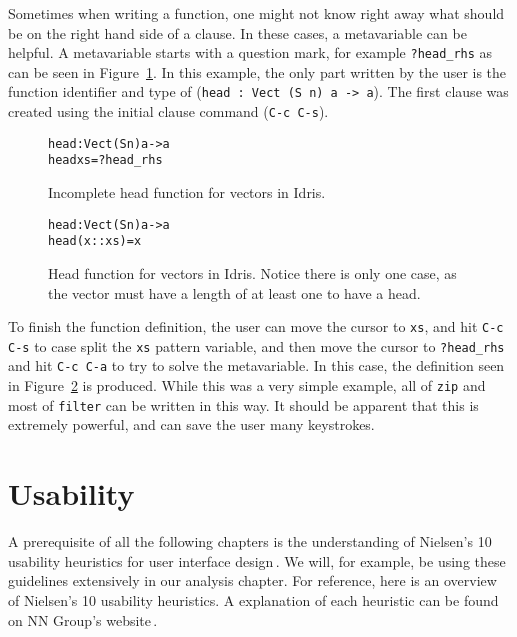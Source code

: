 Sometimes when writing a function, one might not know right away what should be on the right hand side of a clause.
In these cases, a metavariable can be helpful. A metavariable starts with a question mark, for example \texttt{?head\_rhs} as can be seen in Figure~\ref{fig:incomplete_head}.
In this example, the only part written by the user is the function identifier and type of (\texttt{head : Vect (S n) a -> a}).
The first clause was created using the initial clause command (\texttt{C-c C-s}).

\begin{figure}[ht]
\begin{alltt}
head : Vect (S n) a -> a
head xs = ?head_rhs
\end{alltt}
\caption{Incomplete head function for vectors in Idris.}
\label{fig:incomplete_head}
\end{figure}

\begin{figure}[ht]
\begin{alltt}
head : Vect (S n) a -> a
head (x :: xs) = x
\end{alltt}
\caption{Head function for vectors in Idris. Notice there is only one case, as the vector must have a length of at least one to have a head.}
\label{fig:head}
\end{figure}

To finish the function definition, the user can move the cursor to \texttt{xs}, and hit \texttt{C-c C-s} to case split the \texttt{xs} pattern variable, and then move the cursor to \texttt{?head\_rhs} and hit \texttt{C-c C-a} to try to solve the metavariable.
In this case, the definition seen in Figure~\ref{fig:head} is produced.
While this was a very simple example, all of \texttt{zip} and most of \texttt{filter} can be written in this way.
It should be apparent that this is extremely powerful, and can save the user many keystrokes.

\section{Usability}
A prerequisite of all the following chapters is the understanding of Nielsen's
10 usability heuristics for user interface design\,\cite{nielsen1990heuristic}.
We will, for example, be using these guidelines extensively in our analysis chapter.
For reference, here is an overview of Nielsen's 10 usability heuristics.
A explanation of each heuristic can be found on NN Group's
website\,\cite{niesen10heuristicsweb}.

